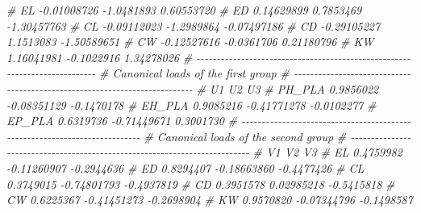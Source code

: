 \documentclass[
]{book}
\newenvironment{Shaded}{\begin{snugshade}}{\end{snugshade}}
\newcommand{\CommentTok}[1]{\textcolor[rgb]{0.56,0.35,0.01}{\textit{#1}}}
\numberwithin{equation}{section}
\begin{document}
\begin{Shaded}
\begin{Highlighting}[]
\CommentTok{\# EL {-}0.01008726 {-}1.0481893  0.60553720}
\CommentTok{\# ED  0.14629899  0.7853469 {-}1.30457763}
\CommentTok{\# CL {-}0.09112023 {-}1.2989864 {-}0.07497186}
\CommentTok{\# CD {-}0.29105227  1.1513083 {-}1.50589651}
\CommentTok{\# CW {-}0.12527616 {-}0.0361706  0.21180796}
\CommentTok{\# KW  1.16041981 {-}0.1022916  1.34278026}
\CommentTok{\# {-}{-}{-}{-}{-}{-}{-}{-}{-}{-}{-}{-}{-}{-}{-}{-}{-}{-}{-}{-}{-}{-}{-}{-}{-}{-}{-}{-}{-}{-}{-}{-}{-}{-}{-}{-}{-}{-}{-}{-}{-}{-}{-}{-}{-}{-}{-}{-}{-}{-}{-}{-}{-}{-}{-}{-}{-}{-}{-}{-}{-}{-}{-}{-}{-}{-}{-}{-}{-}{-}{-}{-}{-}{-}{-}}
\CommentTok{\# Canonical loads of the first group }
\CommentTok{\# {-}{-}{-}{-}{-}{-}{-}{-}{-}{-}{-}{-}{-}{-}{-}{-}{-}{-}{-}{-}{-}{-}{-}{-}{-}{-}{-}{-}{-}{-}{-}{-}{-}{-}{-}{-}{-}{-}{-}{-}{-}{-}{-}{-}{-}{-}{-}{-}{-}{-}{-}{-}{-}{-}{-}{-}{-}{-}{-}{-}{-}{-}{-}{-}{-}{-}{-}{-}{-}{-}{-}{-}{-}{-}{-}}
\CommentTok{\#               U1          U2         U3}
\CommentTok{\# PH\_PLA 0.9856022 {-}0.08351129 {-}0.1470178}
\CommentTok{\# EH\_PLA 0.9085216 {-}0.41771278 {-}0.0102277}
\CommentTok{\# EP\_PLA 0.6319736 {-}0.71449671  0.3001730}
\CommentTok{\# {-}{-}{-}{-}{-}{-}{-}{-}{-}{-}{-}{-}{-}{-}{-}{-}{-}{-}{-}{-}{-}{-}{-}{-}{-}{-}{-}{-}{-}{-}{-}{-}{-}{-}{-}{-}{-}{-}{-}{-}{-}{-}{-}{-}{-}{-}{-}{-}{-}{-}{-}{-}{-}{-}{-}{-}{-}{-}{-}{-}{-}{-}{-}{-}{-}{-}{-}{-}{-}{-}{-}{-}{-}{-}{-}}
\CommentTok{\# Canonical loads of the second group }
\CommentTok{\# {-}{-}{-}{-}{-}{-}{-}{-}{-}{-}{-}{-}{-}{-}{-}{-}{-}{-}{-}{-}{-}{-}{-}{-}{-}{-}{-}{-}{-}{-}{-}{-}{-}{-}{-}{-}{-}{-}{-}{-}{-}{-}{-}{-}{-}{-}{-}{-}{-}{-}{-}{-}{-}{-}{-}{-}{-}{-}{-}{-}{-}{-}{-}{-}{-}{-}{-}{-}{-}{-}{-}{-}{-}{-}{-}}
\CommentTok{\#           V1          V2         V3}
\CommentTok{\# EL 0.4759982 {-}0.11260907 {-}0.2944636}
\CommentTok{\# ED 0.8294407 {-}0.18663860 {-}0.4477426}
\CommentTok{\# CL 0.3749015 {-}0.74801793 {-}0.4937819}
\CommentTok{\# CD 0.3951578  0.02985218 {-}0.5415818}
\CommentTok{\# CW 0.6225367 {-}0.41451273 {-}0.2698904}
\CommentTok{\# KW 0.9570820 {-}0.07344796 {-}0.1498587}


\end{Highlighting}
\end{Shaded}
\end{document}
